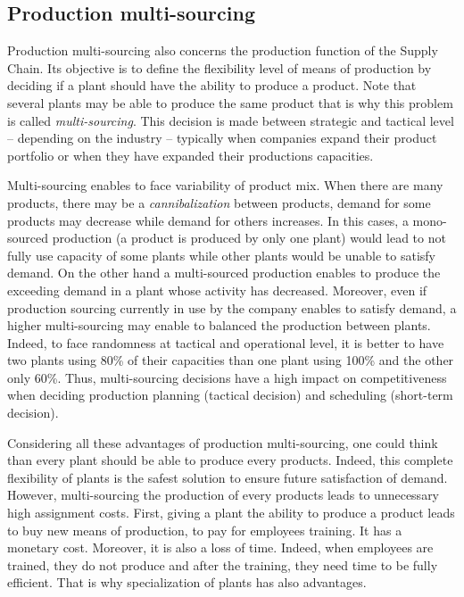 \subsection{Production multi-sourcing}
\label{sec:business-context:argon:multi-sourcing}


Production multi-sourcing also concerns the production function of the Supply Chain.
Its objective is to define the flexibility level of means of production by deciding if a plant should have the ability to produce a product.
Note that several plants may be able to produce the same product that is why this problem is called \emph{multi-sourcing}.
This decision is made between strategic and tactical level -- depending on the industry -- typically when companies expand their product portfolio or when they have expanded their productions capacities.


Multi-sourcing enables to face variability of product mix.
When there are many products, there may be a \emph{cannibalization} between products, \ie demand for some products may decrease while demand for others increases.
In this cases, a mono-sourced production (\ie a product is produced by only one plant) would lead to not fully use capacity of some plants while other plants would be unable to satisfy demand.
On the other hand a multi-sourced production enables to produce the exceeding demand in a plant whose activity has decreased.
Moreover, even if production sourcing currently in use by the company enables to satisfy demand, a higher multi-sourcing may enable to balanced the production between plants.
Indeed, to face randomness at tactical and operational level, it is better to have two plants using 80\% of their capacities than one plant using 100\% and the other only 60\%. 
Thus, multi-sourcing decisions have a high impact on competitiveness when deciding production planning (tactical decision) and scheduling (short-term decision).


Considering all these advantages of production multi-sourcing, one could think than every plant should be able to produce every products.
Indeed, this complete flexibility of plants is the safest solution to ensure future satisfaction of demand.
However, multi-sourcing the production of every products leads to unnecessary high assignment costs.
First, giving a plant the ability to produce a product leads to buy new means of production, to pay for employees training.
It has a monetary cost.
Moreover, it is also a loss of time.
Indeed, when employees are trained, they do not produce and after the training, they need time to be fully efficient.
That is why specialization of plants has also advantages.


